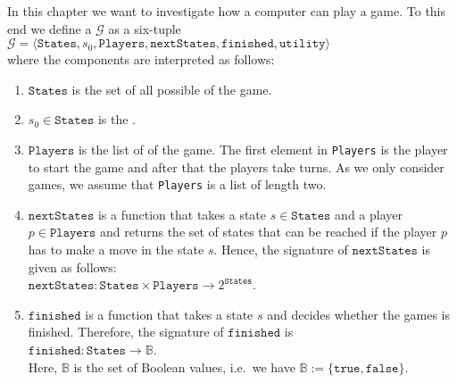 In this chapter we want to investigate how a computer can play a game.  To this end we define a
 $\mathcal{G}$ as a six-tuple 
\\[0.2cm]
\hspace*{1.3cm}
$\mathcal{G} = \langle \texttt{States}, s_0, \texttt{Players}, \texttt{nextStates}, \texttt{finished},\texttt{utility} \rangle$
\\[0.2cm]
where the components are interpreted as follows:
\begin{enumerate}
\item $\texttt{States}$ is the set of all possible  of the game.
\item $s_0 \in \texttt{States}$ is the .
\item $\texttt{Players}$ is  the list of  of the game.  The first element in \texttt{Players} is
      the player to start the game and after that the players take turns.  As we only consider 
      games, we assume that \texttt{Players} is a list of length two.  
\item $\texttt{nextStates}$ is a function that takes a state $s \in \texttt{States}$ and a player $p \in \texttt{Players}$ and returns the set of
      states that can be reached if the player $p$ has to make a move in the state $s$.  Hence, the signature of
      $\texttt{nextStates}$ is given as follows:
      \\[0.2cm]
      \hspace*{1.3cm}
      $\texttt{nextStates}: \texttt{States} \times \texttt{Players} \rightarrow 2^{\texttt{States}}$.
\item $\texttt{finished}$ is a function that takes a state $s$ and decides whether the games is finished.
      Therefore, the signature of $\texttt{finished}$ is
      \\[0.2cm]
      \hspace*{1.3cm}
      $\texttt{finished}: \texttt{States} \rightarrow \mathbb{B}$.
      \\[0.2cm]
      Here, $\mathbb{B}$ is the set of Boolean values, i.e.~we have $\mathbb{B} := \{ \texttt{true}, \texttt{false} \}$.
  

\end{enumerate}
